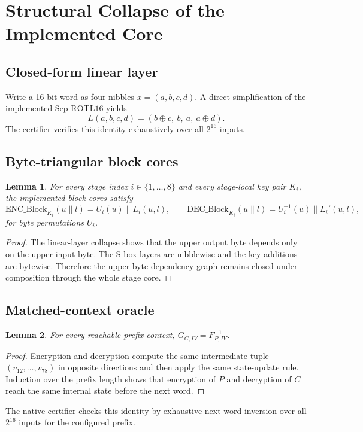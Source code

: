 \documentclass[11pt]{article}
\newtheorem{lemma}{Lemma}
\begin{document}
\section{Structural Collapse of the Implemented Core}
\subsection{Closed-form linear layer}
Write a 16-bit word as four nibbles \(x=(a,b,c,d)\). A direct simplification of the implemented \(\mathrm{Sep\_ROTL16}\) yields
\[
L(a,b,c,d)=(b\oplus c,\ b,\ a,\ a\oplus d).
\]
The certifier verifies this identity exhaustively over all \(2^{16}\) inputs.

\subsection{Byte-triangular block cores}
\begin{lemma}
For every stage index \(i\in\{1,\dots,8\}\) and every stage-local key pair \(K_i\), the implemented block cores satisfy
\[
\mathrm{ENC\_Block}_{K_i}(u\|l)=U_i(u)\|L_i(u,l),\qquad
\mathrm{DEC\_Block}_{K_i}(u\|l)=U_i^{-1}(u)\|L_i'(u,l),
\]
for byte permutations \(U_i\).
\end{lemma}

\begin{proof}
The linear-layer collapse shows that the upper output byte depends only on the upper input byte. The S-box layers are nibblewise and the key additions are bytewise. Therefore the upper-byte dependency graph remains closed under composition through the whole stage core.
\end{proof}

\subsection{Matched-context oracle}
\begin{lemma}
For every reachable prefix context, \(G_{C,IV}=F_{P,IV}^{-1}\).
\end{lemma}

\begin{proof}
Encryption and decryption compute the same intermediate tuple \((v_{12},\dots,v_{78})\) in opposite directions and then apply the same state-update rule. Induction over the prefix length shows that encryption of \(P\) and decryption of \(C\) reach the same internal state before the next word.
\end{proof}

The native certifier checks this identity by exhaustive next-word inversion over all \(2^{16}\) inputs for the configured prefix.
\end{document}
